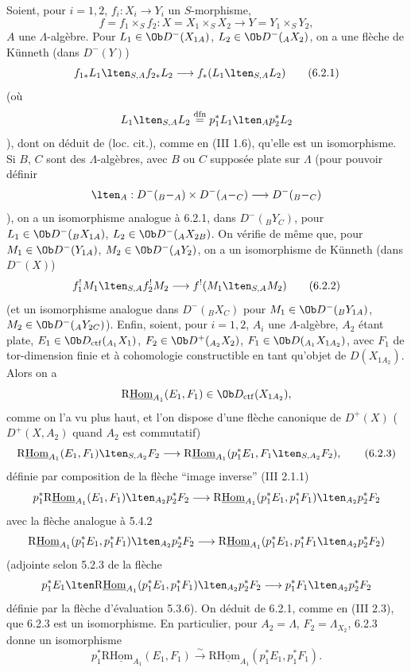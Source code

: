Soient, pour $i=1,2$, $f_i:X_i\to Y_i$ un $S$-morphisme,
\[
f=f_1\times_S f_2:X=X_1\times_SX_2\longrightarrow Y=Y_1\times_SY_2,
\]
$A$ une $\Lambda$-algèbre.
Pour $L_1\in\Ob D^-(X_{1A})$, $L_2\in\Ob D^-({}_AX_2)$, on a une flèche de Künneth (dans $D^-(Y)$)
\begin{equation}
f_{1*}L_1\lten_{S,A}f_{2*}L_2
\longrightarrow
f_*(L_1\lten_{S,A}L_2)
\tag{6.2.1}
\end{equation}
(où
\[
L_1\lten_{S,A}L_2
\stackrel{\mathrm{dfn}}{=}p_1^*L_1\lten_Ap_2^*L_2
\]),
dont on déduit de (loc. cit.), comme en (III 1.6), qu'elle est un isomorphisme. Si $B$, $C$ sont des $\Lambda$-algèbres, avec $B$ ou $C$ supposée plate sur $\Lambda$ (pour pouvoir définir
\[
\lten_A:D^-({}_B{-}_A)\times D^-({}_A{-}_C)\longrightarrow D^-({}_B{-}_C)
\]),
on a un isomorphisme analogue à 6.2.1, dans $D^-({}_BY_C)$, pour $L_1\in\Ob D^-({}_BX_{1A})$, $L_2\in\Ob D^-({}_AX_{2B})$. On vérifie de même que, pour $M_1\in\Ob D^-(Y_{1A})$, $M_2\in\Ob D^-({}_AY_2)$, on a un isomorphisme de Künneth (dans $D^-(X)$)
\begin{equation}
f_1^!M_1\lten_{S,A}f_2^!M_2
\longrightarrow
f^!(M_1\lten_{S,A}M_2)
\tag{6.2.2}
\end{equation}
(et un isomorphisme analogue dans $D^-({}_B X_C)$ pour $M_1\in\Ob D^-({}_BY_{1A})$, $M_2\in\Ob D^-({}_AY_{2C})$). Enfin, soient, pour $i=1,2$, $A_i$ une $\Lambda$-algèbre, $A_2$ étant plate, $E_1\in\Ob D_{\mathrm{ctf}}({}_{A_1}X_1)$, $F_2\in\Ob D^+({}_{A_2}X_2)$, $F_1\in\Ob D({}_{A_1}X_{1A_2})$, avec $F_1$ de tor-dimension finie et à cohomologie constructible en tant qu'objet de $D(X_{1A_2})$. Alors on a
\[
\mathrm{R}\underline{\mathrm{Hom}}_{A_1}(E_1,F_1)\in\Ob D_{\mathrm{ctf}}(X_{1A_2}),
\]
comme on l'a vu plus haut, et l'on dispose d'une flèche canonique de $D^+(X)$ ($D^+(X,A_2)$ quand $A_2$ est commutatif)
\begin{equation}
\mathrm{R}\underline{\mathrm{Hom}}_{A_1}(E_1,F_1)\lten_{S,A_2}F_2
\longrightarrow
\mathrm{R}\underline{\mathrm{Hom}}_{A_1}(p_1^*E_1,F_1\lten_{S,A_2}F_2),
\tag{6.2.3}
\end{equation}
définie par composition de la flèche ``image inverse'' (III 2.1.1)
\[
p_1^*\mathrm{R}\underline{\mathrm{Hom}}_{A_1}(E_1,F_1)\lten_{A_2}p_2^*F_2
\longrightarrow
\mathrm{R}\underline{\mathrm{Hom}}_{A_1}(p_1^*E_1,p_1^*F_1)\lten_{A_2}p_2^*F_2
\]
avec la flèche analogue à 5.4.2
\[
\mathrm{R}\underline{\mathrm{Hom}}_{A_1}(p_1^*E_1,p_1^*F_1)\lten_{A_2}p_2^*F_2
\longrightarrow
\mathrm{R}\underline{\mathrm{Hom}}_{A_1}(p_1^*E_1,p_1^*F_1\lten_{A_2}p_2^*F_2)
\]
(adjointe selon 5.2.3 de la flèche
\[
p_1^*E_1\lten\mathrm{R}\underline{\mathrm{Hom}}_{A_1}(p_1^*E_1,p_1^*F_1)\lten_{A_2}p_2^*F_2
\longrightarrow
p_1^*F_1\lten_{A_2}p_2^*F_2
\]
définie par la flèche d'évaluation 5.3.6). On déduit de 6.2.1, comme en (III 2.3), 
que 6.2.3 est un
isomorphisme. En particulier, pour $A_2=\Lambda$, $F_2=\Lambda_{X_2}$, 6.2.3 donne un isomorphisme
\begin{equation}
p_1^*\mathrm{R}\underline{\mathrm{Hom}}_{A_1}(E_1,F_1)
\xrightarrow{\sim}
\mathrm{R}\underline{\mathrm{Hom}}_{A_1}(p_1^*E_1,p_1^*F_1).
\tag{6.2.4}
\end{equation}

